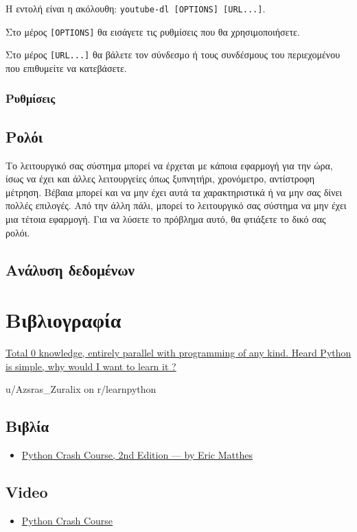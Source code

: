 \documentclass[14pt]{extreport}
\begin{document}
Η εντολή είναι η ακόλουθη: \lstinline{youtube-dl [OPTIONS] [URL...]}.

Στο μέρος \lstinline{[OPTIONS]} θα εισάγετε τις ρυθμίσεις που θα χρησιμοποιήσετε.

Στο μέρος \lstinline{[URL...]} θα βάλετε τον σύνδεσμο ή τους συνδέσμους του περιεχομένου που επιθυμείτε να κατεβάσετε.

\subsection{Ρυθμίσεις}


\newpage
\section{Ρολόι}

Το λειτουργικό σας σύστημα μπορεί να έρχεται με κάποια εφαρμογή για την ώρα, ίσως να έχει και άλλες λειτουργείες όπως ξυπνητήρι, χρονόμετρο, αντίστροφη μέτρηση. Βέβαια μπορεί και να μην έχει αυτά τα χαρακτηριστικά ή να μην σας δίνει πολλές επιλογές. Από την άλλη πάλι, μπορεί το λειτουργικό σας σύστημα να μην έχει μια τέτοια εφαρμογή. Για να λύσετε το πρόβλημα αυτό, θα φτιάξετε το δικό σας ρολόι.

\newpage
\section{Ανάλυση δεδομένων}

\chapter{Βιβλιογραφία}
\epigraph{\href{https://tinyurl.com/ycnad9ch}
    {Total 0 knowledge, entirely parallel with programming of any kind.
        Heard Python is simple, why would I want to learn it ?
    }
}{u/Azsras\_Zuralix on r/learnpython}
\newpage
\section{Βιβλία}
\begin{itemize}
    \item \href{https://tinyurl.com/y7l2a48c}{Python Crash Course, 2nd
              Edition — by Eric Matthes}
\end{itemize}
\section{Video}
\begin{itemize}
    \item \href{https://tinyurl.com/ya8wk4xm}{Python Crash Course}
\end{itemize}
\end{document}
